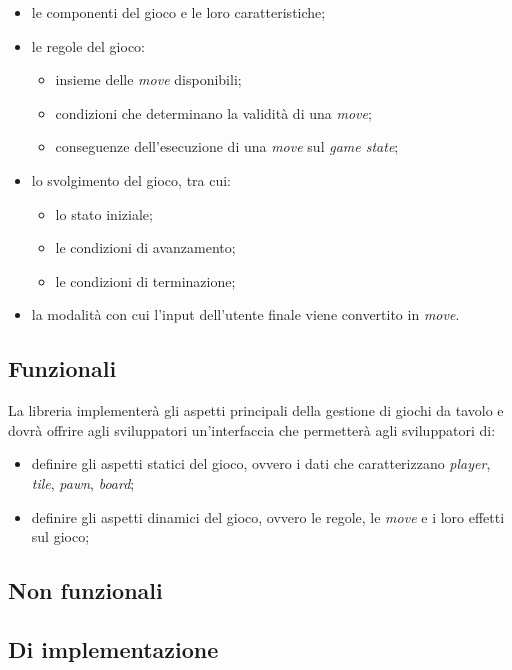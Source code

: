 \begin{itemize}
    \item le componenti del gioco e le loro caratteristiche;
    \item le regole del gioco:
    \begin{itemize}
        \item insieme delle \textit{move} disponibili;
        \item condizioni che determinano la validità di una \textit{move};
        \item conseguenze dell'esecuzione di una \textit{move} sul \textit{game state};
    \end{itemize}
    \item lo svolgimento del gioco, tra cui:
    \begin{itemize}
        \item lo stato iniziale;
        \item le condizioni di avanzamento;
        \item le condizioni di terminazione;
    \end{itemize}
    \item la modalità con cui l'input dell'utente finale viene convertito in \textit{move}. %
\end{itemize}

\subsection{Funzionali}

La libreria implementerà gli aspetti principali della gestione di giochi da tavolo e dovrà offrire agli sviluppatori un'interfaccia che permetterà agli sviluppatori di:

\begin{itemize}
    \item definire gli aspetti statici del gioco, ovvero i dati che caratterizzano \textit{player}, \textit{tile}, \textit{pawn}, \textit{board};
    \item definire gli aspetti dinamici del gioco, ovvero le regole, le \textit{move} e i loro effetti sul gioco;
\end{itemize}

\subsection{Non funzionali}



\subsection{Di implementazione}

